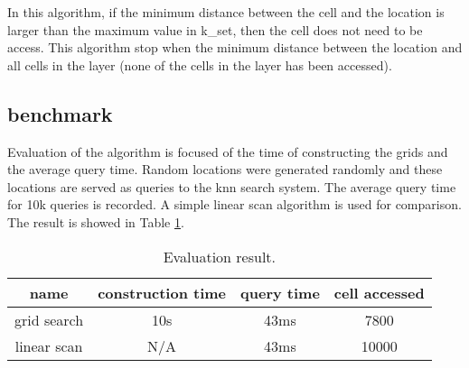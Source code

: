 \documentclass{article}
\def\v#1{{\fontfamily{cmtt}\selectfont #1}}
\begin{document}
In this algorithm, if the minimum distance between the cell and
the location is larger than the maximum value in \v{k\_set},
then the cell does not need to be access. This algorithm stop
when the minimum distance between the location and all cells in the layer
(none of the cells in the layer has been accessed).

\subsection{benchmark}
Evaluation of the algorithm is focused of the time of constructing the grids
and the average query time. Random locations were generated randomly and
these locations are served as queries to the knn search system. The average
query time for 10k queries is recorded. A simple linear scan algorithm is
used for comparison. The result is showed in Table \ref{result}.

\begin{table}[tbh]
  \center
  \footnotesize
  \begin{tabular}{c|c|c|c}
    \textbf{name} & \textbf{construction time} & \textbf{query time} & \textbf{cell accessed}\\
    \hline
    grid search & 10s & 43ms & 7800 \\
    \hline
    linear scan & N/A & 43ms & 10000
  \end{tabular}
  \caption{Evaluation result.}
  \label{result}

\end{table}
\end{document}
